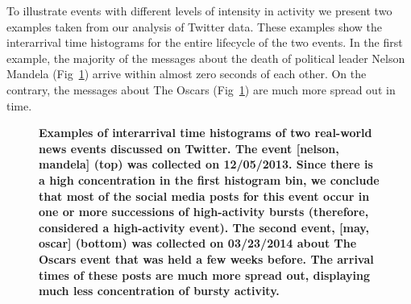 \documentclass[10pt,letterpaper]{article}
\begin{document}
To illustrate events with different levels of intensity in activity we
present two examples taken from our analysis of Twitter data. These
examples show the interarrival time histograms for the entire lifecycle of
the two events. In
the first example, the majority of the messages about
the death of political leader Nelson Mandela
(Fig~\ref{fig:fig1}) arrive within almost zero seconds of
each other. On the contrary, the messages about The Oscars
(Fig~\ref{fig:fig1}) are much more spread out in time.
%
%
%
\begin{figure}[!htb]
  \centering
  \caption{\textbf{Examples of interarrival time histograms of two real-world news
events discussed on Twitter. The event [nelson, mandela] (top) was
      collected on 12/05/2013. Since there is a high
      concentration in the first histogram bin, we conclude that most of the social media posts
      for this event occur in one or more successions of high-activity
      bursts (therefore, considered a high-activity event).
      The second event, [may, oscar] (bottom) was collected
      on 03/23/2014 about The Oscars event that was held a few
      weeks before. The arrival times of these posts are much more spread
      out, displaying much less concentration of bursty activity.} 
  }
  \label{fig:fig1}
\end{figure}
\end{document}
